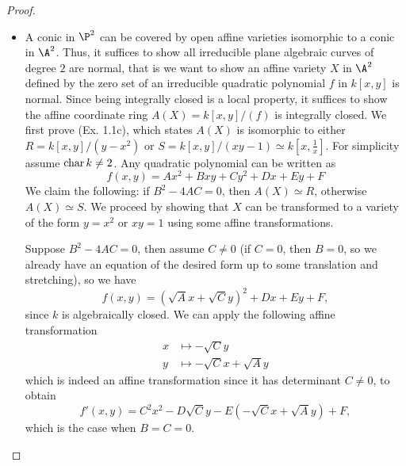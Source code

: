 \documentclass[a4paper]{article}
\begin{document}
\begin{enumerate} [label=\textbf{\arabic*.}, leftmargin=-0.05em]
\begin{proof} $ $ \vspace{0pt}
   \begin{itemize} [leftmargin=0cm]
    \item[(a)] A conic in $\P^2$ can be covered by open affine varieties isomorphic to a conic in $\A^2$.
    Thus, it suffices to show all irreducible plane algebraic curves of degree $2$ are normal, that is we want to show an affine variety $X$ in $\A^2$ defined by the zero set of an irreducible quadratic polynomial $f$ in $k[x, y]$ is normal.
    Since being integrally closed is a local property, it suffices to show the affine coordinate ring $A(X) = k[x, y] / (f)$ is integrally closed.
    We first prove (Ex. 1.1c), which states $A(X)$ is isomorphic to either $R = k[x, y] / (y - x^2)$ or $S = k[x, y] / (xy - 1) \simeq k[x, \frac{1}{x}]$.
    For simplicity assume $\operatorname{char} k \neq 2$. Any quadratic polynomial can be written as
    \begin{equation*}
        f(x, y)  = Ax^2 + Bxy + Cy^2 + Dx + Ey + F
    \end{equation*}
    We claim the following: if $B^2 - 4AC = 0$, then $A(X) \simeq R$, otherwise $A(X) \simeq S$. We proceed by showing that $X$ can be transformed to a variety of the form $y = x^2$ or $xy = 1$ using some affine transformations.

    Suppose $B^2 - 4AC = 0$, then assume $C \neq 0$ (if $C = 0$, then $B = 0$, so we already have an equation of the desired form up to some translation and stretching), so we have
    \begin{equation*}
        f(x, y) = (\sqrt{A}x + \sqrt{C}y)^2 + Dx + Ey + F,
    \end{equation*}
    since $k$ is algebraically closed. We can apply the following affine transformation
    \begin{align*}
        x & \mapsto -\sqrt{C} y\\
        y & \mapsto -\sqrt{C} x + \sqrt{A}y
    \end{align*}
    which is indeed an affine transformation since it has determinant $C \neq 0$, to obtain
    \begin{equation*}
        f'(x, y) = C^2 x^2 - D\sqrt{C}y - E(-\sqrt{C}x + \sqrt{A}y) + F,
    \end{equation*}
    which is the case when $B = C = 0$. 


\end{itemize}
\end{proof}
\end{enumerate}
\end{document}

